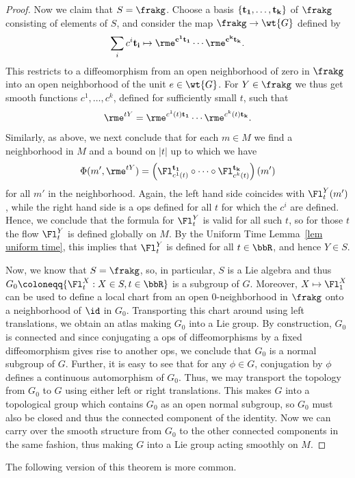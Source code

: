\begin{proof}
    Now we claim that $S=\frakg$. Choose a basis $\{\bf{t}_1,\ldots,\bf{t}_k\}$ of $\frakg$ consisting of elements of $S$, and consider the map $\frakg\to \wt{G}$ defined by 
    \[\sum_i c^i \bf{t}_i\mapsto \rme^{c^1\bf{t}_1}\cdots\rme^{c^k\bf{t}_k}.\]
    This restricts to a diffeomorphism from an open neighborhood of zero in $\frakg$ into an open neighborhood of the unit $e\in \wt{G}$. For $Y\in\frakg$ we thus get smooth functions $c^1,\ldots,c^k$, defined for sufficiently small $t$, such that 
    \[\rme^{tY}=\rme^{c^1(t)\bf{t}_1}\cdots\rme^{c^k(t)\bf{t}_k}.\]
    Similarly, as above, we next conclude that for each $m\in M$ we find a neighborhood in $M$ and a bound on $|t|$ up to which we have 
    \[\Phi(m',\rme^{tY})=\left(\Fl_{c^1(t)}^{\bf{t}_1}\circ\cdots\circ \Fl_{c^k(t)}^{\bf{t}_k}\right)(m')\]
    for all $m'$ in the neighborhood. Again, the left hand side coincides with $\Fl_t^Y(m')$, while the right hand side is a \gls{ops} defined for all $t$ for which the $c^i$ are defined. Hence, we conclude that the formula for $\Fl^Y_t$ is valid for all such $t$, so for those $t$ the flow $\Fl^Y_t$ is defined globally on $M$. By the Uniform Time Lemma~\ref{lem uniform time}, this implies that $\Fl_t^Y$ is defined for all $t\in \bbR$, and hence $Y\in S$.

    Now, we know that $S=\frakg$, so, in particular, $S$ is a Lie algebra and thus $G_0\coloneqq \{\Fl_t^X:X\in S,t\in\bbR\}$ is a subgroup of $G$. Moreover, $X\mapsto \Fl_1^X$ can be used to define a local chart from an open $0$-neighborhood in $\frakg$ onto a neighborhood of $\id$ in $G_0$. Transporting this chart around using left translations, we obtain an atlas making $G_0$ into a Lie group. By construction, $G_0$ is connected and since conjugating a \gls{ops} of diffeomorphisms by a fixed diffeomorphism gives rise to another \gls{ops}, we conclude that $G_0$ is a normal subgroup of $G$. Further, it is easy to see that for any $\phi\in G$, conjugation by $\phi$ defines a continuous automorphism of $G_0$. Thus, we may transport the topology from $G_0$ to $G$ using either left or right translations. This makes $G$ into a topological group which contains $G_0$ as an open normal subgroup, so $G_0$ must also be closed and thus the connected component of the identity. Now we can carry over the smooth structure from $G_0$ to the other connected components in the same fashion, thus making $G$ into a Lie group acting smoothly on $M$.
\end{proof}

The following version of this theorem is more common.

